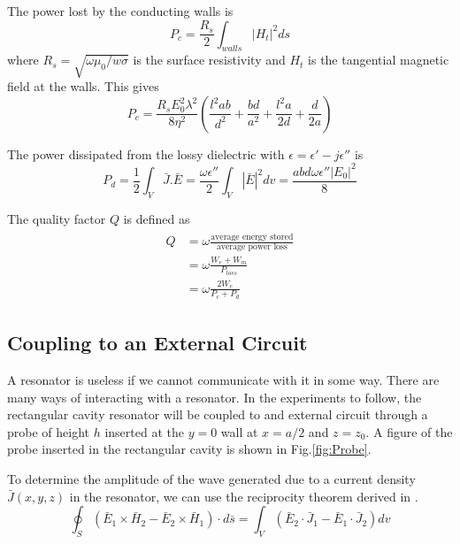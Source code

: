 The power lost by the conducting walls is
\begin{equation}
P_c=\frac{R_s}{2}\int_{walls} |H_t|^2ds
\end{equation}
where $R_s=\sqrt{\omega\mu_0/w\sigma}$ is the surface resistivity and $H_t$ is the tangential magnetic field at the walls. This gives
\begin{equation}
P_c=\frac{R_sE_0^2\lambda^2}{8\eta^2}\left(\frac{l^2ab}{d^2}+\frac{bd}{a^2}+\frac{l^2a}{2d}+\frac{d}{2a}\right)
\end{equation}

The power dissipated from the lossy dielectric with $\epsilon = \epsilon'-j\epsilon''$ is
\begin{equation}
P_d = \frac{1}{2}\int_V\bar{J}.\bar{E}=\frac{\omega\epsilon''}{2}\int_V|\bar{E}|^2dv=\frac{abd\omega\epsilon''|E_0|^2}{8}
\end{equation}

The quality factor $Q$ is defined as
\begin{align}
\begin{split}
Q&=\omega\frac{\text{average energy stored}}{\text{average power loss}}\\
&=\omega\frac{W_e+W_m}{P_{loss}}\\
&=\omega\frac{2W_e}{P_c+P_d}
\end{split}
\end{align}

\subsection{Coupling to an External Circuit}

\iffalse
A resonator is useless if we cannot communicate with it in some way. There are many ways of interacting with a resonator. In the experiments to follow, the rectangular cavity resonator will be coupled to and external circuit through a probe of height $h$ inserted at the $y=0$ wall at $x=a/2$ and $z=z_0$. A figure of the probe inserted in the rectangular cavity is shown in Fig.\ref{fig:Probe}.


To determine the amplitude of the wave generated due to a current density $\bar{J}(x,y,z)$ in the resonator, we can use the reciprocity theorem derived in \cite{Pozar2009}.
\begin{equation}
\label{eqn:reciprocity Th}
\oint_S \left( \bar{E}_1 \times\bar{H}_2 - \bar{E}_2 \times\bar{H}_1\right)\cdot d\bar{s}=\int_V \left(\bar{E}_2\cdot\bar{J}_1 - \bar{E}_1\cdot\bar{J}_2\right)dv
\end{equation}

